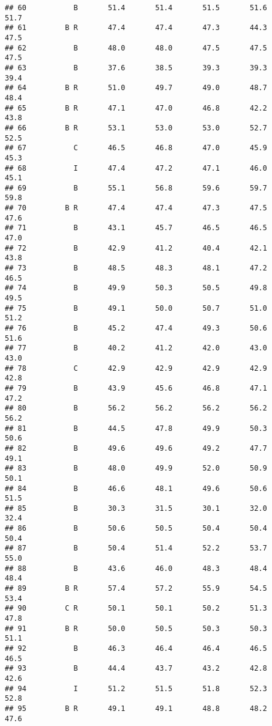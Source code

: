 \documentclass[]{article}
\begin{document}
\begin{verbatim}
## 60           B       51.4       51.4       51.5       51.6       51.7
## 61         B R       47.4       47.4       47.3       44.3       47.5
## 62           B       48.0       48.0       47.5       47.5       47.5
## 63           B       37.6       38.5       39.3       39.3       39.4
## 64         B R       51.0       49.7       49.0       48.7       48.4
## 65         B R       47.1       47.0       46.8       42.2       43.8
## 66         B R       53.1       53.0       53.0       52.7       52.5
## 67           C       46.5       46.8       47.0       45.9       45.3
## 68           I       47.4       47.2       47.1       46.0       45.1
## 69           B       55.1       56.8       59.6       59.7       59.8
## 70         B R       47.4       47.4       47.3       47.5       47.6
## 71           B       43.1       45.7       46.5       46.5       47.0
## 72           B       42.9       41.2       40.4       42.1       43.8
## 73           B       48.5       48.3       48.1       47.2       46.5
## 74           B       49.9       50.3       50.5       49.8       49.5
## 75           B       49.1       50.0       50.7       51.0       51.2
## 76           B       45.2       47.4       49.3       50.6       51.6
## 77           B       40.2       41.2       42.0       43.0       43.0
## 78           C       42.9       42.9       42.9       42.9       42.8
## 79           B       43.9       45.6       46.8       47.1       47.2
## 80           B       56.2       56.2       56.2       56.2       56.2
## 81           B       44.5       47.8       49.9       50.3       50.6
## 82           B       49.6       49.6       49.2       47.7       49.1
## 83           B       48.0       49.9       52.0       50.9       50.1
## 84           B       46.6       48.1       49.6       50.6       51.5
## 85           B       30.3       31.5       30.1       32.0       32.4
## 86           B       50.6       50.5       50.4       50.4       50.4
## 87           B       50.4       51.4       52.2       53.7       55.0
## 88           B       43.6       46.0       48.3       48.4       48.4
## 89         B R       57.4       57.2       55.9       54.5       53.4
## 90         C R       50.1       50.1       50.2       51.3       47.8
## 91         B R       50.0       50.5       50.3       50.3       51.1
## 92           B       46.3       46.4       46.4       46.5       46.5
## 93           B       44.4       43.7       43.2       42.8       42.6
## 94           I       51.2       51.5       51.8       52.3       52.8
## 95         B R       49.1       49.1       48.8       48.2       47.6

\end{verbatim}
\end{document}
